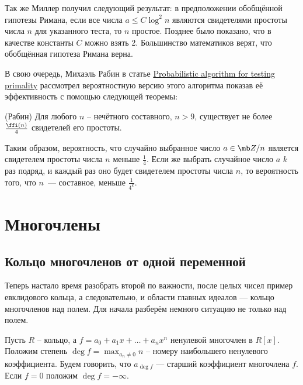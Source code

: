 Так же Миллер получил следующий результат: в предположении обобщённой гипотезы Римана, если все числа $a\leq C \log^2 n $ являются свидетелями простоты числа $n$ для указанного теста, то $n$ простое. Позднее было показано, что в качестве константы $C$ можно взять 2. Большинство математиков верят, что обобщённая гипотеза Римана верна.

В свою очередь, Михаэль Рабин в статье \href{https://ac.els-cdn.com/0022314X80900840/1-s2.0-0022314X80900840-main.pdf?_tid=e8201658-e83e-11e7-9793-00000aab0f26&acdnat=1514074434_a1f0bbeeacc3f326abc83943e330aa13}{Probabilistic algorithm for testing primality} рассмотрел вероятностную версию этого алгоритма показав её эффективность с помощью следующей теоремы:


\thrm(Рабин) 
Для любого $n$ -- нечётного составного, $n>9$, существует не более $\frac{\ffi(n)}{4}$ свидетелей его простоты.
\ethrm

Таким образом, вероятность, что случайно выбранное число $a\in\mb Z/n$ является свидетелем простоты числа $n$ меньше $\frac14$. Если же  выбрать случайное число $a$ $k$ раз подряд, и каждый раз оно будет  свидетелем простоты числа $n$, то вероятность того, что $n$~--- составное, меньше $\frac{1}{4^k}$.









\chapter{Многочлены}



\section{Кольцо многочленов от одной переменной}


Теперь настало время разобрать второй по важности, после целых чисел пример евклидового кольца, а следовательно, и области главных идеалов --- кольцо многочленов над полем. Для начала разберём немного ситуацию не только над полем.

 Пусть $R$ -- кольцо, а $f=a_0+a_1x+\dots+a_nx^n$ ненулевой многочлен в $R[x]$. Положим степень $\deg f = \max_{a_n\neq 0} n$ -- номеру наибольшего ненулевого коэффициента. Будем говорить, что $a_{\deg f}$ --- старший коэффициент многочлена $f$. Если $f=0$ положим $\deg f= -\infty$.
\edfn

